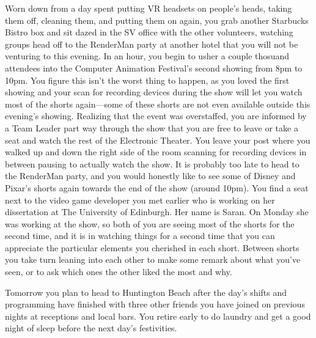 \documentclass[../main.tex]{subfiles}
\begin{document}
Worn down from a day spent putting VR headsets on people's heads, taking them off, cleaning them, and putting them on again, you grab another Starbucks Bistro box and sit dazed in the SV office with the other volunteers, watching groups head off to the RenderMan party at another hotel that you will not be venturing to this evening. In an hour, you begin to usher a couple thosuand attendees into the Computer Animation Festival's second showing from 8pm to 10pm. You figure this isn't the worst thing to happen, as you loved the first showing and your scan for recording devices during the show will let you watch most of the shorts again---some of these shorts are not even available outside this evening's showing. Realizing that the event was overstaffed, you are informed by a Team Leader part way through the show that you are free to leave or take a seat and watch the rest of the Electronic Theater. You leave your post where you walked up and down the right side of the room scanning for recording devices in between pausing to actually watch the show. It is probably too late to head to the RenderMan party, and you would honestly like to see some of Disney and Pixar's shorts again towards the end of the show (around 10pm). You find a seat next to the video game developer you met earlier who is working on her dissertation at The University of Edinburgh. Her name is Saran. On Monday she was working at the show, so both of you are seeing most of the shorts for the second time, and it is in watching things for a second time that you can appreciate the particular elements you cherished in each short. Between shorts you take turn leaning into each other to make some remark about what you've seen, or to ask which ones the other liked the most and why.

Tomorrow you plan to head to Huntington Beach after the day's shifts and programming have finished with three other friends you have joined on previous nights at receptions and local bars. You retire early to do laundry and get a good night of sleep before the next day's festivities.
\end{document}

